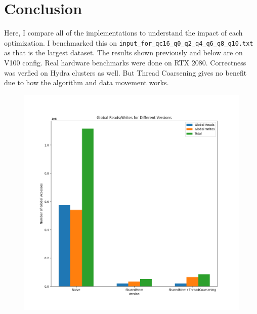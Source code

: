 \documentclass{article}
\begin{document}
\section{Conclusion}
Here, I compare all of the implementations to understand the impact of each optimization. I benchmarked this on \verb|input_for_qc16_q0_q2_q4_q6_q8_q10.txt| as that is the largest dataset. The results shown previously and below are on V100 config. Real hardware benchmarks were done on RTX 2080. Correctness was verfied on Hydra clusters as well. But Thread Coarsening gives no benefit due to how the algorithm and data movement works. 

\begin{figure}[H]
    \centerline{\includegraphics[width=6in]{global_reads_writes.png}}
\end{figure}
\end{document}
